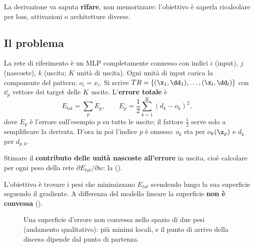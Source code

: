 \begin{attenzione}
La derivazione va saputa \textbf{rifare}, non memorizzare: l'obiettivo è saperla ricalcolare per loss, attivazioni o
architetture diverse.
\end{attenzione}

\subsection{Il problema}

La rete di riferimento è un MLP completamente connesso con indici $i$ (input), $j$ (nascoste), $k$ (uscita;
$K$ unità di uscita). Ogni unità di input carica la
componente del pattern: $o_i = x_i$. Si scrive $TR = \{(\x_1,\dd_1),\dots,(\x_l,\dd_l)\}$ con $\dd_p$ vettore dei
target delle $K$ uscite. L'\textbf{errore totale} è
\begin{equation}\label{eq:etot}
E_{tot} = \sum_pE_p,\qquad E_p = \frac12\sum_{k=1}^{K}(d_k-o_k)^2 ,
\end{equation}
dove $E_p$ è l'errore sull'esempio $p$ su tutte le uscite; il fattore $\frac12$ serve solo a semplificare la
derivata. D'ora in poi l'indice $p$ è omesso: $o_k$ sta per $o_k(\x_p)$ e $d_k$ per $d_{p,k}$.

\begin{definizione}
Stimare il \textbf{contributo delle unità nascoste all'errore} in uscita, cioè calcolare per ogni peso della rete
$\partial E_{tot}/\partial w$: la  ().
\end{definizione}

L'obiettivo è trovare i pesi che minimizzano $E_{tot}$ scendendo lungo la sua superficie seguendo il gradiente. A
differenza del modello lineare la superficie \textbf{non è convessa} ().

\begin{figure}[ht]
\centering
{}
\caption{Una superficie d'errore non convessa nello spazio di due pesi (andamento qualitativo): più minimi
locali, e il punto di arrivo della discesa dipende dal punto di partenza.}
\label{fig:superficie-nonconvessa}
\end{figure}

